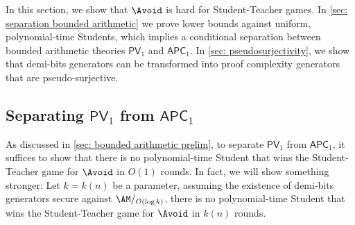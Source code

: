 \documentclass[10pt,a4paper]{article}
\theoremstyle{definition}
\theoremstyle{remark}
\newcommand{\PV}{\mathsf{PV}}
\newcommand{\APC}{\mathsf{APC}}
\begin{document}
In this section, we show that $\Avoid$ is hard for Student-Teacher games. In \autoref{sec: separation bounded arithmetic} we prove lower bounds against uniform, polynomial-time Students, which implies a conditional separation between bounded arithmetic theories $\PV_1$ and $\APC_1$. In \autoref{sec: pseudosurjectivity}, we show that demi-bits generators can be transformed into proof complexity generators that are pseudo-surjective.

\subsection{Separating \texorpdfstring{$\PV_1$}{PV1} from \texorpdfstring{$\APC_1$}{APC1}}\label{sec: separation bounded arithmetic}

As discussed in \autoref{sec: bounded arithmetic prelim}, to separate $\PV_1$ from $\APC_1$, it suffices to show that there is no polynomial-time Student that wins the Student-Teacher game for $\Avoid$ in $O(1)$ rounds. In fact, we will show something stronger: Let $k = k(n)$ be a parameter, assuming the existence of demi-bits generators secure against $\AM/_{O(\log k)}$, there is no polynomial-time Student that wins the Student-Teacher game for $\Avoid$ in $k(n)$ rounds.
\end{document}
